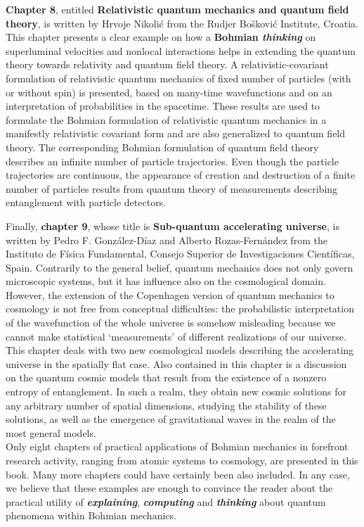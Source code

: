 \documentclass[onecolumn,nofootinbib, secnumarabic, amsmath, nobibnotes,11pt,aps,pra]{revtex4-1}
\begin{document}
\textbf{Chapter 8}, entitled \textbf{Relativistic quantum mechanics and quantum field theory}, is written by Hrvoje Nikoli\'c from the Rudjer Bo\v{s}kovi\'{c} Institute, Croatia. This chapter presents a clear example on how a \textbf{Bohmian \emph{thinking}} on superluminal velocities and nonlocal interactions helps in extending the quantum theory towards relativity and quantum field theory. A relativistic-covariant formulation of relativistic quantum mechanics of fixed number of particles (with or without spin) is presented, based on many-time wavefunctions and on an interpretation of probabilities in the spacetime. These results are used to formulate the Bohmian formulation of relativistic quantum mechanics in a manifestly relativistic covariant form and are also generalized to quantum field theory. The corresponding Bohmian formulation of quantum field theory describes an infinite number of particle trajectories. Even though the particle trajectories are continuous, the appearance of creation and destruction of a finite number of particles results from quantum theory of measurements describing entanglement with particle detectors.

Finally, \textbf{chapter 9}, whose title is \textbf{Sub-quantum accelerating universe}, is written by Pedro F. Gonz\'alez-D\'{i}az and Alberto Rozas-Fern\'andez from the Instituto de F\'isica Fundamental, Consejo Superior de Investigaciones Cient\'ificas, Spain. Contrarily to the general belief, quantum mechanics does not only govern microscopic systems, but it has influence also on the cosmological domain. However, the extension of the Copenhagen version of quantum mechanics to cosmology is not free from conceptual difficulties: the probabilistic interpretation of the wavefunction of the whole universe is somehow misleading because we cannot make statistical `measurements' of different realizations of our universe. This chapter deals with two new cosmological models describing the accelerating universe in the spatially flat case.  Also contained in this chapter is a discussion on the quantum cosmic models that result from the existence of a nonzero entropy of entanglement. In such a realm, they obtain new cosmic solutions for any arbitrary number of spatial dimensions, studying the stability of these solutions, as well as the emergence of gravitational waves in the realm of the most general models. \\


Only eight chapters of practical applications of Bohmian mechanics in forefront research activity, ranging from atomic systems to cosmology, are presented in this book. Many more chapters could have certainly been also included. In any case, we believe that  these examples are enough to convince the reader about the practical utility of \textbf{\emph{explaining}}, \textbf{\emph{computing}} and \textbf{\emph{thinking}} about quantum phenomena within Bohmian mechanics. 
\end{document}
